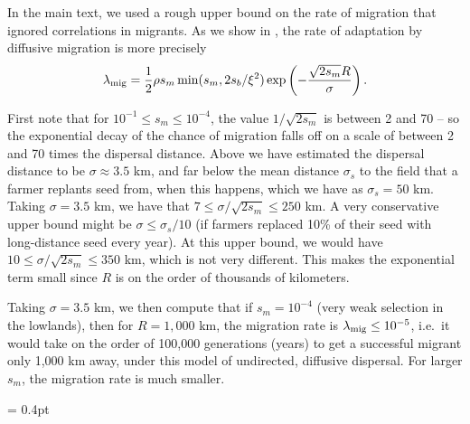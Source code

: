 In the main text, we used a rough upper bound on the rate of migration
that ignored correlations in migrants.
As we show in \citet{ralph2014convergent}, 
the rate of adaptation by diffusive migration is more precisely
\begin{align*}
  \lambda_{\text{mig}} = \frac{1}{2} \rho s_m \min(s_m,2s_b/\xi^2) \exp\left(- \frac{\sqrt{2 s_m}R}{\sigma} \right) .
\end{align*}


First note that for $10^{-1} \le s_m \le 10^{-4}$, the value $1/\sqrt{2s_m}$ is between 2 and 70 --
so the exponential decay of the chance of migration falls off on a scale of between 2 and 70 times the dispersal distance.
Above we have estimated the dispersal distance to be $\sigma \approx 3.5$ km,
and far below the mean distance $\sigma_s$ to the field that a farmer replants seed from, when this happens,
which we have as $\sigma_s = 50$ km.
Taking $\sigma=3.5$ km, we have that $7 \le \sigma/\sqrt{2s_m} \le 250$ km.
A very conservative upper bound might be $\sigma \le \sigma_s/10$ (if farmers replaced 10\% of their seed with long-distance seed every year).
At this upper bound, we would have $10 \le \sigma/\sqrt{2s_m} \le 350$ km,
which is not very different.
This makes the exponential term small since $R$ is on the order of thousands of kilometers.


Taking $\sigma=3.5$ km, we then compute that 
if $s_m = 10^{-4}$ (very weak selection in the lowlands), then for $R=1,000$ km, the migration rate is $\lambda_{\text{mig}} \le 10^{-5}$,
i.e.\ it would take on the order of 100,000 generations (years) to get a successful migrant only 1,000 km away,
under this model of undirected, diffusive dispersal.
For larger $s_m$, the migration rate is much smaller.




\newpage


\doublerulesep = 0.4pt

\renewcommand{\thefigure}{S\arabic{figure}}
\renewcommand{\thetable}{S\arabic{table}}


